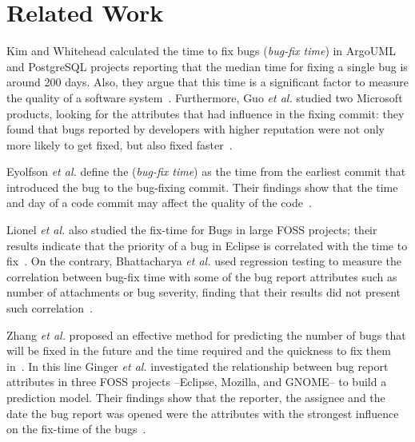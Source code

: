 \documentclass[10pt, conference]{IEEEtran}
\begin{document}
\section{Related Work}
\label{sec:relatedwork}


Kim and Whitehead calculated the time to fix bugs (\emph{bug-fix time}) in ArgoUML and PostgreSQL projects reporting that the median time for fixing a single bug is around 200 days. Also, they argue that this time is a significant factor to measure the quality of a software system~\cite{kim2006long}. Furthermore, Guo \emph{et al.} studied two Microsoft products, looking for the attributes that had influence in the fixing commit: they found that bugs reported by developers with higher reputation were not only more likely to get fixed, but also fixed faster~\cite{guo2010characterizing}.

Eyolfson \emph{et al.} define the (\emph{bug-fix time}) as the time from the earliest commit that introduced the bug to the bug-fixing commit. Their findings show that the time and day of a code commit may affect the quality of the code~\cite{eyolfson2011time}.

Lionel \emph{et al.} also studied the fix-time for Bugs in large FOSS projects; their results indicate that the priority of a bug in Eclipse is correlated with the time to fix~\cite{marks2011studying}. On the contrary, Bhattacharya \emph{et al.} used regression testing to measure the correlation between bug-fix time with some of the bug report attributes such as number of attachments or bug severity, finding that their results did not present such correlation~\cite{bhattacharya2011bug}.



Zhang \emph{et al.} proposed an effective method for predicting the number of bugs that will be fixed in the future and the time required and the quickness to fix them in~\cite{zhang2013predicting}. In this line Ginger \emph{et al.} investigated the relationship between bug report attributes in three FOSS projects --Eclipse, Mozilla, and GNOME-- to build a prediction model. Their findings show that the reporter, the assignee and the date the bug report was opened were the attributes with the strongest influence on the fix-time of the bugs~\cite{giger2010predicting}.
\end{document}
